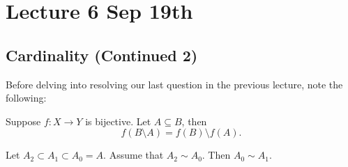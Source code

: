 \documentclass[notoc,notitlepage]{tufte-book}
\begin{document}

\chapter{Lecture 6 Sep 19th}%
\label{chp:lecture_6_sep_19th}

\section{Cardinality (Continued 2)}%
\label{sec:cardinality_continued_2}

Before delving into resolving our last question in the previous lecture, note the following:

\begin{note}
  Suppose $f : X \to Y$ is bijective. Let $A \subseteq B$, then
  \begin{equation*}
    f( B \setminus A ) = f(B) \setminus f(A).
  \end{equation*}
\end{note}

\begin{thm}
\label{thm:cantor_schroder_bernstein_theorem}
  Let $A_2 \subset A_1 \subset A_0 = A$. Assume that $A_2 \sim A_0$. Then $A_0 \sim A_1$.
\end{thm}
\end{document}
